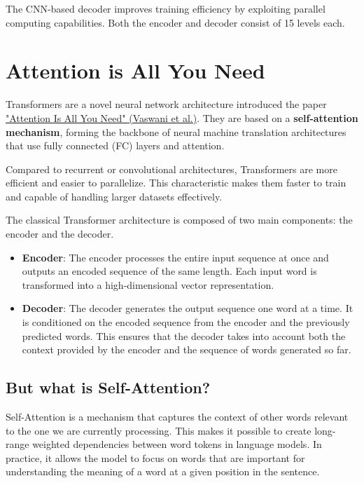The CNN-based decoder improves training efficiency by exploiting parallel computing capabilities. Both the encoder and decoder consist of 15 levels each.

\section{Attention is All You Need}

Transformers are a novel neural network architecture introduced the paper \href{https://arxiv.org/pdf/1706.03762}{"Attention Is All You Need" (Vaswani et al.)}. They are based on a \textbf{self-attention mechanism}, forming the backbone of neural machine translation architectures that use fully connected (FC) layers and attention.

Compared to recurrent or convolutional architectures, Transformers are more efficient and easier to parallelize. This characteristic makes them faster to train and capable of handling larger datasets effectively.

The classical Transformer architecture is composed of two main components: the encoder and the decoder.
\begin{itemize}
    \item \textbf{Encoder}: The encoder processes the entire input sequence at once and outputs an encoded sequence of the same length. Each input word is transformed into a high-dimensional vector representation.
    
    \item \textbf{Decoder}: The decoder generates the output sequence one word at a time. It is conditioned on the encoded sequence from the encoder and the previously predicted words. This ensures that the decoder takes into account both the context provided by the encoder and the sequence of words generated so far.
\end{itemize}


\subsection{But what is Self-Attention?}

Self-Attention is a mechanism that captures the context of other words relevant to the one we are currently processing. This makes it possible to create long-range weighted dependencies between word tokens in language models. In practice, it allows the model to focus on words that are important for understanding the meaning of a word at a given position in the sentence.


